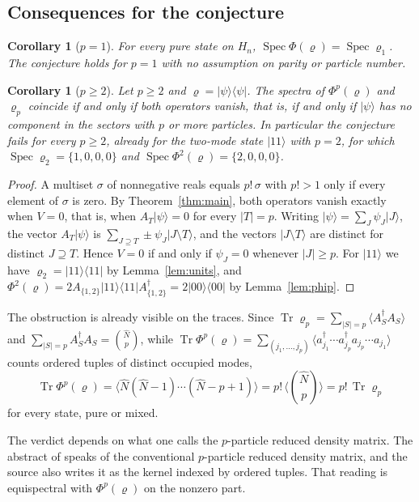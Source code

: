 \documentclass[11pt,a4paper]{article}
\newtheorem{corollary}[theorem]{Corollary}
\theoremstyle{definition}
\theoremstyle{plain}
\DeclareMathOperator{\Tr}{Tr}
\DeclareMathOperator{\Spec}{Spec}
\newcommand{\ket}[1]{\lvert#1\rangle}
\newcommand{\bra}[1]{\langle#1\rvert}
\newcommand{\Nop}{\hat N}
\begin{document}
\subsection{Consequences for the conjecture}

\begin{corollary}[$p=1$]\label{cor:p1}
For every pure state on $H_n$, $\Spec\Phi(\varrho)=\Spec\varrho_1$. The
conjecture holds for $p=1$ with no assumption on parity or particle number.
\end{corollary}

\begin{corollary}[$p\ge2$]\label{cor:p2}
Let $p\ge2$ and $\varrho=\ket\psi\bra\psi$. The spectra of $\Phi^p(\varrho)$
and $\varrho_p$ coincide if and only if both operators vanish, that is, if
and only if $\ket\psi$ has no component in the sectors with $p$ or more
particles. In particular the conjecture fails for every $p\ge2$, already for
the two-mode state $\ket{11}$ with $p=2$, for which $\Spec\varrho_2=\{1,0,0,0\}$
and $\Spec\Phi^2(\varrho)=\{2,0,0,0\}$.
\end{corollary}

\begin{proof}
A multiset $\sigma$ of nonnegative reals equals $p!\,\sigma$ with $p!>1$ only
if every element of $\sigma$ is zero. By Theorem~\ref{thm:main}, both
operators vanish exactly when $V=0$, that is, when $A_T\ket\psi=0$ for every
$|T|=p$. Writing $\ket\psi=\sum_J\psi_J\ket J$, the vector $A_T\ket\psi$ is
$\sum_{J\supseteq T}\pm\psi_J\ket{J\setminus T}$, and the vectors
$\ket{J\setminus T}$ are distinct for distinct $J\supseteq T$. Hence $V=0$ if
and only if $\psi_J=0$ whenever $|J|\ge p$. For $\ket{11}$ we have
$\varrho_2=\ket{11}\bra{11}$ by Lemma~\ref{lem:units}, and
$\Phi^2(\varrho)=2A_{\{1,2\}}\ket{11}\bra{11}A_{\{1,2\}}^\dagger
=2\ket{00}\bra{00}$ by Lemma~\ref{lem:phip}.
\end{proof}

The obstruction is already visible on the traces. Since
$\Tr\varrho_p=\sum_{|S|=p}\langle A_S^\dagger A_S\rangle$ and
$\sum_{|S|=p}A_S^\dagger A_S=\binom{\Nop}{p}$, while
$\Tr\Phi^p(\varrho)=\sum_{(j_1,\dots,j_p)}\langle a_{j_1}^\dagger\cdots
a_{j_p}^\dagger a_{j_p}\cdots a_{j_1}\rangle$ counts ordered tuples of
distinct occupied modes,
\[
\Tr\Phi^p(\varrho)=\big\langle\Nop(\Nop-1)\cdots(\Nop-p+1)\big\rangle
=p!\,\Big\langle\binom{\Nop}{p}\Big\rangle=p!\,\Tr\varrho_p
\]
for every state, pure or mixed.

The verdict depends on what one calls the $p$-particle reduced density
matrix. The abstract of \cite{AmosovFilippov2017} speaks of the
conventional $p$-particle reduced density matrix, and the source also writes
it as the kernel indexed by ordered tuples. That reading is equispectral with
$\Phi^p(\varrho)$ on the nonzero part.
\end{document}
